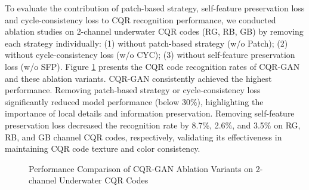 \documentclass[preprint,12pt]{elsarticle}
\begin{document}
To evaluate the contribution of patch-based strategy, self-feature preservation loss and cycle-consistency loss to CQR recognition performance, we conducted ablation studies on 2-channel underwater CQR codes (RG, RB, GB) by removing each strategy individually: (1) without patch-based strategy (w/o Patch); (2) without cycle-consistency loss (w/o CYC); (3) without self-feature preservation loss (w/o SFP).
Figure \ref{fig:ablation_comparison} presents the CQR code recognition rates of CQR-GAN and these ablation variants.
CQR-GAN consistently achieved the highest performance. 
Removing patch-based strategy or cycle-consistency loss significantly reduced model performance (below 30\%), highlighting the importance of local details and information preservation. Removing self-feature preservation loss decreased the recognition rate by 8.7\%, 2.6\%, and 3.5\% on RG, RB, and GB channel CQR codes, respectively, validating its effectiveness in maintaining CQR code texture and color consistency.

\begin{figure}[h]
  \centering
  \caption{Performance Comparison of CQR-GAN Ablation Variants on 2-channel Underwater CQR Codes}
  \label{fig:ablation_comparison}
\end{figure}
\end{document}
